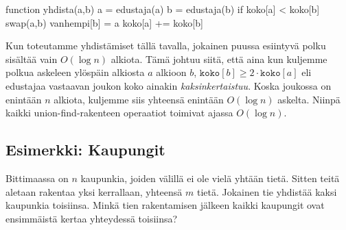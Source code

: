 \begin{code}
function yhdista(a,b)
    a = edustaja(a)
    b = edustaja(b)
    if koko[a] < koko[b]
        swap(a,b)
    vanhempi[b] = a
    koko[a] += koko[b]
\end{code}

Kun toteutamme yhdistämiset tällä tavalla, jokainen
puussa esiintyvä polku sisäl\-tää vain $O(\log n)$ alkiota.
Tämä johtuu siitä, että aina kun kuljemme polkua
askeleen ylöspäin alkiosta $a$ alkioon $b$,
$\texttt{koko}[b] \ge 2 \cdot \texttt{koko}[a]$ eli
edustajaa vastaavan joukon koko ainakin \emph{kaksinkertaistuu}.
Koska joukossa on enintään $n$ alkiota,
kuljemme siis yhteensä enintään $O(\log n)$ askelta.
Niinpä kaikki union-find-rakenteen operaatiot
toimivat ajassa $O(\log n)$.

\subsection{Esimerkki: Kaupungit}

Bittimaassa on $n$ kaupunkia, joiden välillä ei ole vielä yhtään tietä.
Sitten teitä aletaan rakentaa yksi kerrallaan, yhteensä $m$ tietä.
Jokainen tie yhdistää kaksi kaupunkia toisiinsa.
Minkä tien rakentamisen jälkeen kaikki kaupungit ovat ensimmäistä
kertaa yhteydessä toisiinsa?

